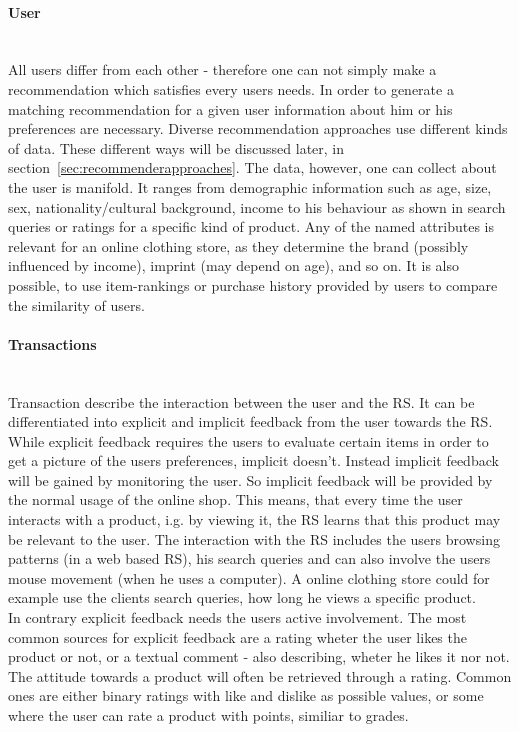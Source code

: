 \paragraph{User}~\\
All users differ from each other - therefore one can not simply make a recommendation which satisfies every users needs.
In order to generate a matching recommendation for a given user information about him or his preferences are necessary.
Diverse recommendation approaches use different kinds of data.
These different ways will be discussed later, in section~\ref{sec:recommenderapproaches}.
The data, however, one can collect about the user is manifold.
It ranges from demographic information such as age, size, sex, nationality/cultural background, income to his behaviour as shown in search queries or ratings for a specific kind of product.
Any of the named attributes is relevant for an online clothing store, as they determine the brand (possibly influenced by income), imprint (may depend on age), and so on.\citep[p.8-9]{ricci:2011}
It is also possible, to use item-rankings or purchase history provided by users to compare the similarity of users.\citep[p.~377-378]{pradel:2011}

\paragraph{Transactions}~\\
\label{sec:feedback}
Transaction describe the interaction between the user and the RS.\citep[p.~9]{ricci:2011}
It can be differentiated into explicit and implicit feedback from the user towards the RS.
While explicit feedback requires the users to evaluate certain items in order to get a picture of the users preferences, implicit doesn't.
Instead implicit feedback will be gained by monitoring the user.\citep[p.~76-77]{lops:2011}
So implicit feedback will be provided by the normal usage of the online shop.
This means, that every time the user interacts with a product, i.g. by viewing it, the RS learns that this product may be relevant to the user.\citep{taghipour:2007}
The interaction with the RS includes the users browsing patterns (in a web based RS), his search queries and can also involve the users mouse movement (when he uses a computer).\citep[p.~146]{koren:2011}
A online clothing store could for example use the clients search queries, how long he views a specific product.\\
In contrary explicit feedback needs the users active involvement.
The most common sources for explicit feedback are a rating wheter the user likes the product or not, or a textual comment - also describing, wheter he likes it nor not.
The attitude towards a product will often be retrieved through a rating.
Common ones are either binary ratings with like and dislike as possible values, or some where the user can rate a product with points, similiar to grades.\citep[p.~77]{lops:2011}




